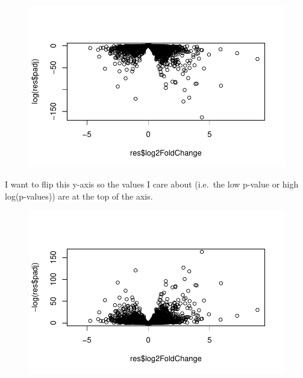 \documentclass[
  letterpaper,
  DIV=11,
  numbers=noendperiod]{scrartcl}
\newenvironment{Shaded}{\begin{snugshade}}{\end{snugshade}}
\newcommand{\FunctionTok}[1]{\textcolor[rgb]{0.28,0.35,0.67}{#1}}
\newcommand{\NormalTok}[1]{\textcolor[rgb]{0.00,0.23,0.31}{#1}}
\newcommand{\SpecialCharTok}[1]{\textcolor[rgb]{0.37,0.37,0.37}{#1}}
\begin{document}
\begin{figure}[H]

{\centering \includegraphics{class12_files/figure-pdf/unnamed-chunk-35-1.pdf}

}

\end{figure}

I want to flip this y-axis so the values I care about (i.e.~the low
p-value or high log(p-values)) are at the top of the axis.

\begin{Shaded}
\end{Shaded}

\begin{figure}[H]

{\centering \includegraphics{class12_files/figure-pdf/unnamed-chunk-36-1.pdf}

}

\end{figure}
\end{document}
